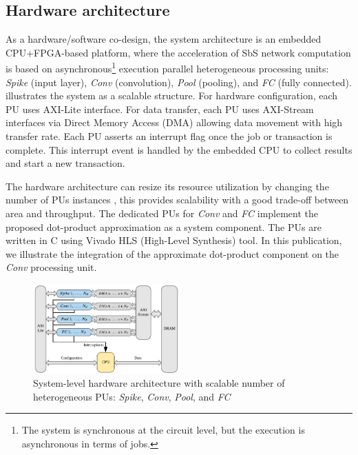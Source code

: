 \subsection{Hardware architecture} \label{Hardware_architecture}
As a hardware/software co-design, the system architecture is an embedded CPU+FPGA-based platform, where the acceleration of SbS network computation is based on asynchronous\footnote{The system is synchronous at the circuit level, but the execution is asynchronous in terms of jobs.} execution  parallel heterogeneous processing units: \emph{Spike} (input layer), \emph{Conv} (convolution), \emph{Pool} (pooling), and \emph{FC} (fully connected).  illustrates the system  as a scalable structure. For hardware configuration, each PU uses AXI-Lite interface. For data transfer, each PU uses AXI-Stream interfaces via Direct Memory Access (DMA) allowing data movement with high transfer rate. Each PU asserts an interrupt flag once the job or transaction is complete. This interrupt event is handled by the embedded CPU to collect results and start a new transaction.

The hardware architecture can resize its resource utilization by changing the number of PUs instances , this provides scalability with a good trade-off between area and throughput. The dedicated PUs for \emph{Conv} and \emph{FC} implement the proposed dot-product approximation as a system component. The PUs are written in C using Vivado HLS (High-Level Synthesis) tool. In this publication, we illustrate the integration of the approximate dot-product component on the \emph{Conv} processing unit.

\begin{figure}[t!]
	\centering
	\includegraphics[width=0.5\textwidth]{../figures/sbs_hw.pdf}
	\caption{System-level hardware architecture with scalable number of heterogeneous PUs: \emph{Spike}, \emph{Conv}, \emph{Pool}, and \emph{FC}}
	\label{fig:hw_sbs}
\end{figure}

